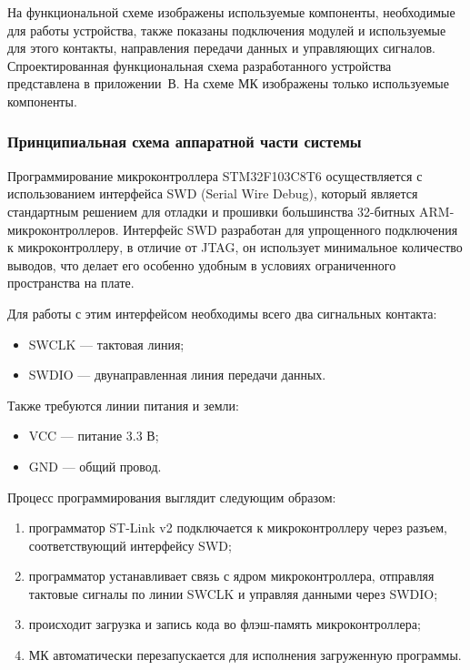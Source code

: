 На функциональной схеме изображены используемые компоненты, необходимые для работы устройства, также показаны подключения модулей и используемые для этого контакты, направления передачи данных и управляющих сигналов.
Спроектированная функциональная схема разработанного устройства представлена в приложении~В.
На схеме МК изображены только используемые компоненты.




\subsubsection{Принципиальная схема аппаратной части системы}


Программирование микроконтроллера STM32F103C8T6 осуществляется с использованием интерфейса SWD (Serial Wire Debug), который является стандартным решением для отладки и прошивки большинства 32-битных ARM-микроконтроллеров.
Интерфейс SWD разработан для упрощенного подключения к микроконтроллеру, в отличие от JTAG, он использует минимальное количество выводов, что делает его особенно удобным в условиях ограниченного пространства на плате.

Для работы с этим интерфейсом необходимы всего два сигнальных контакта:
\begin{itemize}
    \item SWCLK — тактовая линия;
    \item SWDIO — двунаправленная линия передачи данных.
\end{itemize}

Также требуются линии питания и земли:
\begin{itemize}
    \item VCC — питание 3.3 В;
    \item GND — общий провод.
\end{itemize}

Процесс программирования выглядит следующим образом:

\begin{enumerate}
    \item программатор ST-Link v2 подключается к микроконтроллеру через разъем, соответствующий интерфейсу SWD;
    \item программатор устанавливает связь с ядром микроконтроллера, отправляя тактовые сигналы по линии SWCLK и управляя данными через SWDIO;
    \item происходит загрузка и запись кода во флэш-память микроконтроллера;
    \item МК автоматически перезапускается для исполнения загруженную программы.
\end{enumerate}

